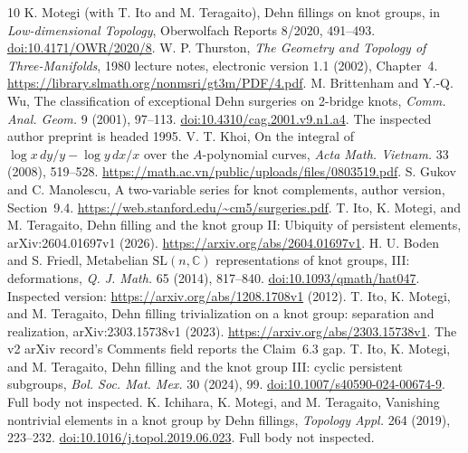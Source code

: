 \documentclass[11pt]{article}
\begin{document}
\begin{thebibliography}{10}\small
{} K. Motegi (with T. Ito and M. Teragaito), Dehn fillings on knot
groups, in \emph{Low-dimensional Topology}, Oberwolfach Reports 8/2020,
491--493. \href{https://doi.org/10.4171/OWR/2020/8}{doi:10.4171/OWR/2020/8}.
 W. P. Thurston, \emph{The Geometry and Topology of Three-Manifolds},
1980 lecture notes, electronic version 1.1 (2002), Chapter~4.
\url{https://library.slmath.org/nonmsri/gt3m/PDF/4.pdf}.
 M. Brittenham and Y.-Q. Wu, The classification of exceptional
Dehn surgeries on 2-bridge knots, \emph{Comm. Anal. Geom.} 9 (2001), 97--113.
\href{https://doi.org/10.4310/cag.2001.v9.n1.a4}{doi:10.4310/cag.2001.v9.n1.a4}.
The inspected author preprint is headed 1995.
 V. T. Khoi, On the integral of $\log x\,dy/y-\log y\,dx/x$
over the $A$-polynomial curves, \emph{Acta Math. Vietnam.} 33 (2008), 519--528.
\url{https://math.ac.vn/public/uploads/files/0803519.pdf}.
 S. Gukov and C. Manolescu, A two-variable series for knot
complements, author version, Section~9.4.
\url{https://web.stanford.edu/~cm5/surgeries.pdf}.
 T. Ito, K. Motegi, and M. Teragaito, Dehn filling and the
knot group II: Ubiquity of persistent elements, arXiv:2604.01697v1 (2026).
\url{https://arxiv.org/abs/2604.01697v1}.
 H. U. Boden and S. Friedl, Metabelian $\mathrm{SL}(n,\mathbb C)$
representations of knot groups, III: deformations, \emph{Q. J. Math.} 65
(2014), 817--840. \href{https://doi.org/10.1093/qmath/hat047}{doi:10.1093/qmath/hat047}.
Inspected version: \url{https://arxiv.org/abs/1208.1708v1} (2012).
 T. Ito, K. Motegi, and M. Teragaito, Dehn filling trivialization
on a knot group: separation and realization, arXiv:2303.15738v1 (2023).
\url{https://arxiv.org/abs/2303.15738v1}. The v2 arXiv record's Comments field reports the Claim~6.3 gap.
 T. Ito, K. Motegi, and M. Teragaito, Dehn filling and the knot
group III: cyclic persistent subgroups, \emph{Bol. Soc. Mat. Mex.} 30 (2024), 99.
\href{https://doi.org/10.1007/s40590-024-00674-9}{doi:10.1007/s40590-024-00674-9}.
Full body not inspected.
 K. Ichihara, K. Motegi, and M. Teragaito, Vanishing nontrivial
elements in a knot group by Dehn fillings, \emph{Topology Appl.} 264 (2019),
223--232. \href{https://doi.org/10.1016/j.topol.2019.06.023}{doi:10.1016/j.topol.2019.06.023}.
Full body not inspected.
\end{thebibliography}
\end{document}
